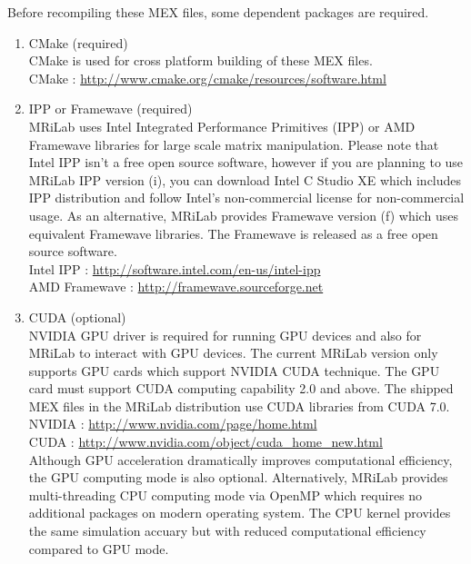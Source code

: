 \documentclass{book}%
\begin{document}
Before recompiling these MEX files, some dependent packages are required.
\begin{enumerate}

\item CMake (required)\\
CMake is used for cross platform building of these MEX files.\\

CMake : \url{http://www.cmake.org/cmake/resources/software.html} \\

\item IPP or Framewave (required)\\
MRiLab uses Intel Integrated Performance Primitives (IPP) or AMD Framewave libraries for large scale matrix manipulation. Please note that Intel IPP isn't a free open source software, however if you are planning to use MRiLab IPP version (i), you can download Intel C Studio XE which includes IPP distribution and follow Intel's non-commercial license for non-commercial usage. As an alternative, MRiLab provides Framewave version (f) which uses equivalent Framewave libraries. The Framewave is released as a free open source software.\\

Intel IPP : \url{http://software.intel.com/en-us/intel-ipp} \\
AMD Framewave : \url{http://framewave.sourceforge.net} \\

\item CUDA (optional)\\
NVIDIA GPU driver is required for running GPU devices and also for MRiLab to interact with GPU devices. The current MRiLab version only supports GPU cards which support NVIDIA CUDA technique. The GPU card must support CUDA computing capability 2.0 and above. The shipped MEX files in the MRiLab distribution use CUDA libraries from CUDA 7.0. \\

NVIDIA : \url{http://www.nvidia.com/page/home.html} \\
CUDA : \url{http://www.nvidia.com/object/cuda_home_new.html} \\

Although GPU acceleration dramatically improves computational efficiency, the GPU computing mode is also optional. Alternatively, MRiLab provides multi-threading CPU computing mode via OpenMP which requires no additional packages on modern operating system. The CPU kernel provides the same simulation accuary but with reduced computational efficiency compared to GPU mode.


\end{enumerate}
\end{document}

